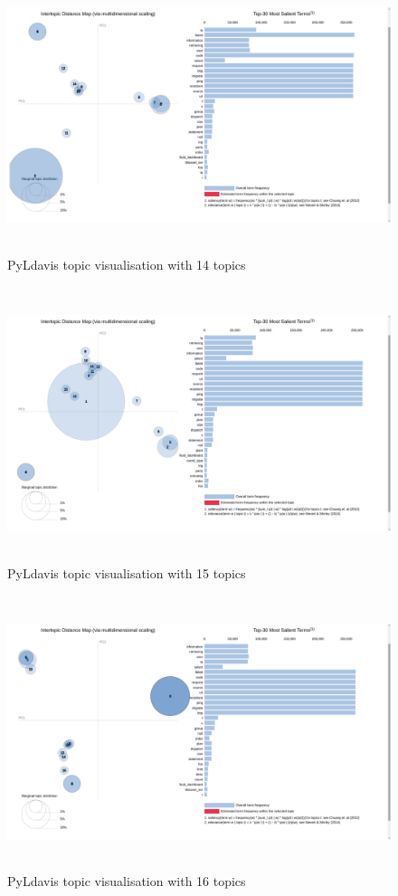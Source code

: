  \begin{figure}[!h]
    \centering
    \includegraphics[width=15cm, height=8cm,trim=0 0 100px 0, clip=true]{figures/pyldavis/pyldavis_14.png}
    \caption{PyLdavis topic visualisation with 14 topics}
    \label{fig:pyldavis_14}
\end{figure}

 \begin{figure}[!h]
    \centering
    \includegraphics[width=15cm, height=8cm,trim=0 0 100px 0, clip=true]{figures/pyldavis/pyldavis_15.png}
    \caption{PyLdavis topic visualisation with 15 topics}
    \label{fig:pyldavis_15}
\end{figure}

 \begin{figure}[!h]
    \centering
    \includegraphics[width=15cm, height=8cm,trim=0 0 100px 0, clip=true]{figures/pyldavis/pyldavis_16.png}
    \caption{PyLdavis topic visualisation with 16 topics}
    \label{fig:pyldavis_16}
\end{figure}

